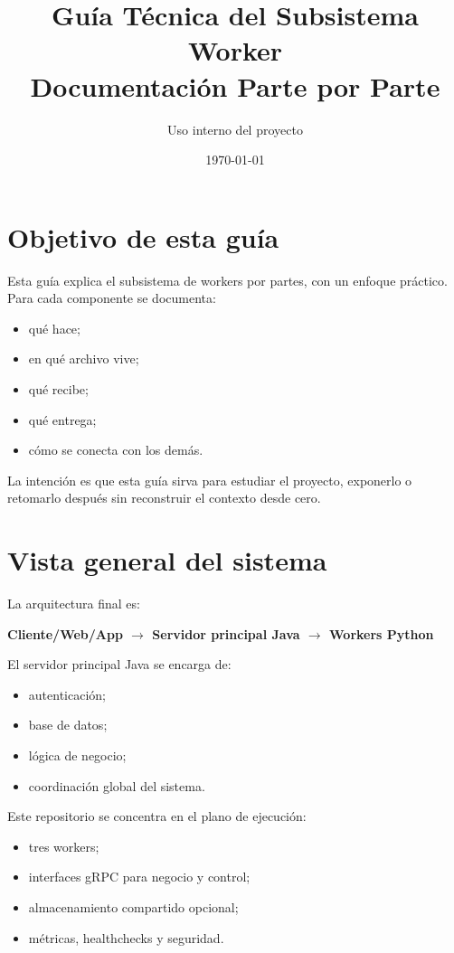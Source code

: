 \documentclass[11pt]{article}
\title{\textbf{Guía Técnica del Subsistema Worker}\\Documentación Parte por Parte}
\author{Uso interno del proyecto}
\date{\today}
\begin{document}
\maketitle
\tableofcontents
\newpage

\section{Objetivo de esta guía}
Esta guía explica el subsistema de workers por partes, con un enfoque práctico. Para cada componente se documenta:
\begin{itemize}
\item qué hace;
\item en qué archivo vive;
\item qué recibe;
\item qué entrega;
\item cómo se conecta con los demás.
\end{itemize}

La intención es que esta guía sirva para estudiar el proyecto, exponerlo o retomarlo después sin reconstruir el contexto desde cero.

\section{Vista general del sistema}
La arquitectura final es:

\begin{center}
\textbf{Cliente/Web/App $\rightarrow$ Servidor principal Java $\rightarrow$ Workers Python}
\end{center}

El servidor principal Java se encarga de:
\begin{itemize}
\item autenticación;
\item base de datos;
\item lógica de negocio;
\item coordinación global del sistema.
\end{itemize}

Este repositorio se concentra en el plano de ejecución:
\begin{itemize}
\item tres workers;
\item interfaces gRPC para negocio y control;
\item almacenamiento compartido opcional;
\item métricas, healthchecks y seguridad.
\end{itemize}
\end{document}
